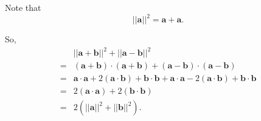 \documentclass[../hw9]{subfiles}
\begin{document}
Note that \[{||\mathbf{a}||}^2=\mathbf{a}+\mathbf{a}.\]

So, 
\begin{align*}
    &{||\mathbf{a}+\mathbf{b}||}^2+{||\mathbf{a}-\mathbf{b}||}^2\\
    =&(\mathbf{a}+\mathbf{b})\cdot(\mathbf{a}+\mathbf{b})+(\mathbf{a}-\mathbf{b})\cdot(\mathbf{a}-\mathbf{b})\\
    =&\mathbf{a}\cdot\mathbf{a}+2(\mathbf{a}\cdot\mathbf{b})+\mathbf{b}\cdot\mathbf{b}+\mathbf{a}\cdot\mathbf{a}-2(\mathbf{a}\cdot\mathbf{b})+\mathbf{b}\cdot\mathbf{b}\\
    =&2(\mathbf{a}\cdot\mathbf{a})+2(\mathbf{b}\cdot\mathbf{b})\\
    =&2({||\mathbf{a}||}^2+{||\mathbf{b}||}^2).
\end{align*}
\end{document}
